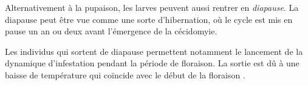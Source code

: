Alternativement à la pupaison, les larves peuvent aussi rentrer en \emph{diapause}.
La diapause peut être vue comme une sorte d'hibernation, où le cycle est mis en pause un an ou deux avant l'émergence de la cécidomyie.



Les individus qui sortent de diapause permettent notamment le lancement de la dynamique d'infestation pendant la période de floraison.
La sortie est dû à une baisse de température qui coïncide avec le début de la floraison \citep{pauldiap}.

























